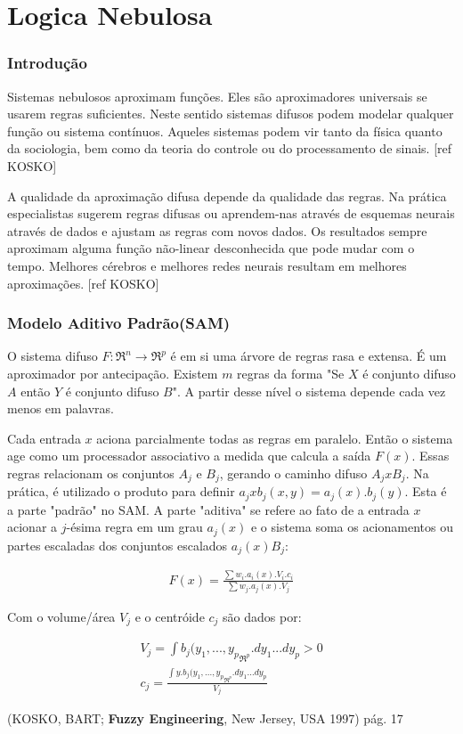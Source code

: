 \section{Logica Nebulosa}

\subsubsection{Introdução}

Sistemas nebulosos aproximam funções. Eles são aproximadores universais se usarem regras suficientes. 
Neste sentido sistemas difusos podem modelar qualquer função ou sistema contínuos. Aqueles sistemas podem 
vir tanto da física quanto da sociologia, bem como da teoria do controle ou do processamento de sinais.
[ref KOSKO]

A qualidade da aproximação difusa depende da qualidade das regras. Na prática especialistas sugerem regras
difusas ou aprendem-nas através de esquemas neurais através de dados e ajustam as regras com novos dados.
Os resultados sempre aproximam alguma função não-linear desconhecida que pode mudar com o tempo. Melhores 
cérebros e melhores redes neurais resultam em melhores aproximações. [ref KOSKO]

\subsubsection{Modelo Aditivo Padrão(SAM)}

O sistema difuso $F:\Re^n \rightarrow \Re^p$ é em si uma árvore de regras rasa e extensa. É um aproximador
por antecipação. Existem $m$ regras da forma "Se $X$ é conjunto difuso $A$ então $Y$ é conjunto difuso $B$".
A partir desse nível o sistema depende cada vez menos em palavras. 

Cada entrada $x$ aciona parcialmente todas as regras em paralelo. Então o sistema age como um processador 
associativo a medida que calcula a saída
$F(x)$. 
Essas regras relacionam os conjuntos $A_j$ e $B_j$, gerando o caminho difuso $A_j x B_j$. Na prática,
é utilizado o produto para definir $ a_j x b_j (x,y) = a_j(x).b_j(y)$. Esta é a parte "padrão" no SAM.
A parte "aditiva" se refere ao fato de a entrada $x$ acionar a $j$-ésima regra em um grau $a_j(x)$ e o sistema 
soma os acionamentos ou partes escaladas dos conjuntos escalados $a_j(x)B_j$:

\begin{eqnarray}
F(x) = \frac{\sum w_i.a_i(x).V_i.c_i}{\sum w_j.a_j(x).V_j}
\end{eqnarray}

Com o volume/área $V_j$ e o centróide $c_j$ são dados por:

\begin{eqnarray}
V_j = \int{b_j(y_1,...,y_p}_{\Re^{p}}.dy_1...dy_p > 0\\
c_j = \frac{\int{y.b_j(y_1,...,y_p}_{\Re^{p}}.dy_1...dy_p}{V_j}
\end{eqnarray}



(KOSKO, BART; \textbf{Fuzzy Engineering}, New Jersey, USA 1997) pág. 17
